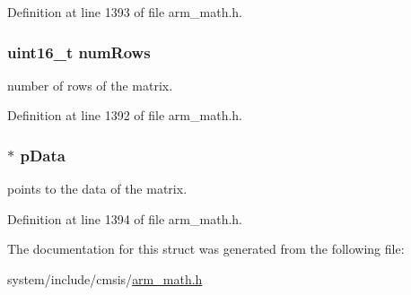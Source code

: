 Definition at line 1393 of file arm\+\_\+math.\+h.

\subsubsection[{\texorpdfstring{num\+Rows}{numRows}}]{\setlength{\rightskip}{0pt plus 5cm}uint16\+\_\+t num\+Rows}\hypertarget{structarm__matrix__instance__q15_a1bcf80ccdc2acc29198f1592ae300390}{}\label{structarm__matrix__instance__q15_a1bcf80ccdc2acc29198f1592ae300390}
number of rows of the matrix. 

Definition at line 1392 of file arm\+\_\+math.\+h.

\subsubsection[{\texorpdfstring{p\+Data}{pData}}]{$\ast$ p\+Data}\hypertarget{structarm__matrix__instance__q15_a817ede38365e63e561a12069c6c5c087}{}\label{structarm__matrix__instance__q15_a817ede38365e63e561a12069c6c5c087}
points to the data of the matrix. 

Definition at line 1394 of file arm\+\_\+math.\+h.



The documentation for this struct was generated from the following file\+:\begin{DoxyCompactItemize}
\item 
system/include/cmsis/\hyperlink{arm__math_8h}{arm\+\_\+math.\+h}\end{DoxyCompactItemize}
